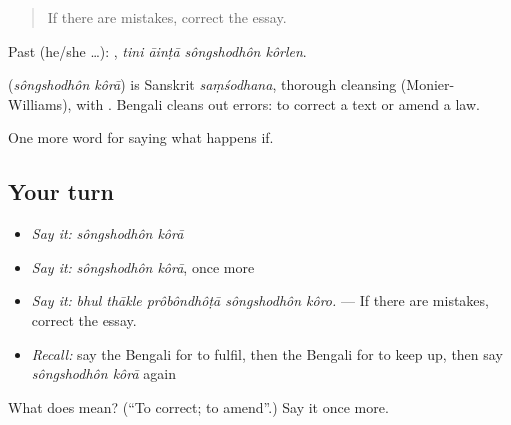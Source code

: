 \begin{quote}
If there are mistakes, correct the essay.
\end{quote}

Past (he/she …):    , \emph{tini āinṭā sôngshodhôn kôrlen}.

\begin{cousinweb}
\textbf{ } (\emph{sôngshodhôn kôrā}) is Sanskrit \emph{saṃśodhana}, thorough cleansing (Monier-Williams), with . Bengali cleans out errors: to correct a text or amend a law.
\end{cousinweb}

\begin{grammarlens}[title={What you've built}]
One more word for saying what happens if.
\end{grammarlens}

\subsection*{Your turn}
\begin{itemize}
\raggedright
  \item \emph{Say it:} \emph{sôngshodhôn kôrā}
  \item \emph{Say it:} \emph{sôngshodhôn kôrā}, once more
  \item \emph{Say it:} \emph{bhul thākle prôbôndhôṭā sôngshodhôn kôro.} — If there are mistakes, correct the essay.
  \item \emph{Recall:} say the Bengali for to fulfil, then the Bengali for to keep up, then say \emph{sôngshodhôn kôrā} again
\end{itemize}

\begin{tcolorbox}[breakable,colback=teal!4,colframe=teal!35!black,title={Before you move on}]
What does   mean? (\textquotedblleft{}To correct; to amend\textquotedblright{}.) Say it once more.
\end{tcolorbox}
